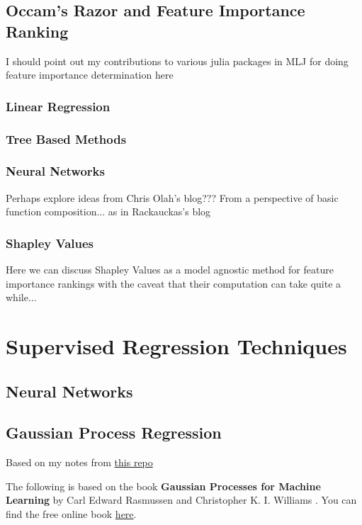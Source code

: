 \subsection{Occam's Razor and Feature Importance Ranking}
I should point out my contributions to various julia packages in MLJ for doing feature importance determination here
\subsubsection{Linear Regression}
\subsubsection{Tree Based Methods}
\subsubsection{Neural Networks}
Perhaps explore ideas from Chris Olah's blog??? From a perspective of basic function composition... as in Rackauckas's blog
\subsubsection{Shapley Values}
Here we can discuss Shapley Values as a model agnostic method for feature importance rankings with the caveat that their computation can take quite a while...



\section{Supervised Regression Techniques}
\subsection{Neural Networks}
\subsection{Gaussian Process Regression}

Based on my notes from \href{https://github.com/john-waczak/MLJGaussianProcesses.jl/blob/main/notebooks/gpr/gaussian_process_regression_overview.ipynb}{this repo}

The following is based on the book \textbf{Gaussian Processes for Machine Learning} by Carl Edward Rasmussen and Christopher K. I. Williams \cite{gaussian-process-book}. You can find the free online book \href{https://gaussianprocess.org/gpml/}{here}.

